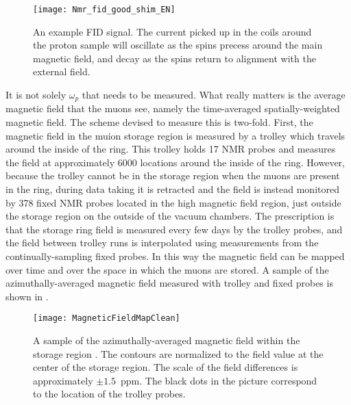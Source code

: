 \begin{figure}[]
    \centering
    \texttt{[image: Nmr\_fid\_good\_shim\_EN]}
    \caption[FID signal]{An example FID signal. The current picked up in the coils around the proton sample will oscillate as the spins precess around the main magnetic field, and decay as the spins return to alignment with the external field.}
    \label{fig:FID}
\end{figure}

It is not solely $\omega_{p}$ that needs to be measured. What really matters is the average magnetic field that the muons see, namely the time-averaged spatially-weighted magnetic field. The scheme devised to measure this is two-fold. First, the magnetic field in the muion storage region is measured by a trolley which travels around the inside of the ring. This trolley holds 17 NMR probes and measures the field at approximately 6000 locations around the inside of the ring. However, because the trolley cannot be in the storage region when the muons are present in the ring, during data taking it is retracted and the field is instead monitored by 378 fixed NMR probes located in the high magnetic field region, just outside the storage region on the outside of the vacuum chambers. The prescription is that the storage ring field is measured every few days by the trolley probes, and the field between trolley runs is interpolated using measurements from the continually-sampling fixed probes. In this way the magnetic field can be mapped over time and over the space in which the muons are stored. A sample of the azimuthally-averaged magnetic field measured with trolley and fixed probes is shown in .

\begin{figure}[]
    \centering
    \texttt{[image: MagneticFieldMapClean]}
    \caption[Azimuthally averaged magnetic field sample]{A sample of the azimuthally-averaged magnetic field within the storage region \cite{fieldmap}. The contours are normalized to the field value at the center of the storage region. The scale of the field differences is approximately $\pm 1.5$~ppm. The black dots in the picture correspond to the location of the trolley probes.}
    \label{fig:AverageMagneticField}
\end{figure}


